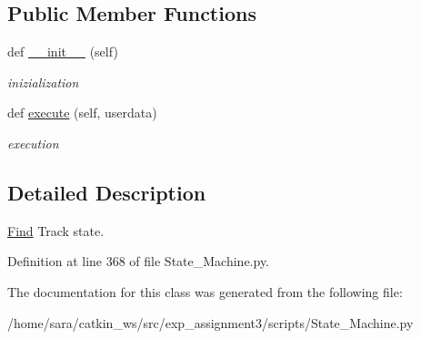 \subsection*{Public Member Functions}
\begin{DoxyCompactItemize}
\item 
\mbox{\label{classState__Machine_1_1Find__Track_abfa42aea92e882a9a1011290337e412e}} 
def \hyperlink{classState__Machine_1_1Find__Track_abfa42aea92e882a9a1011290337e412e}{\+\_\+\+\_\+init\+\_\+\+\_\+} (self)
\begin{DoxyCompactList}\small\item\em inizialization \end{DoxyCompactList}\item 
\mbox{\label{classState__Machine_1_1Find__Track_a3c72cc1a7b85cf64567464d119641e5e}} 
def \hyperlink{classState__Machine_1_1Find__Track_a3c72cc1a7b85cf64567464d119641e5e}{execute} (self, userdata)
\begin{DoxyCompactList}\small\item\em execution \end{DoxyCompactList}\end{DoxyCompactItemize}


\subsection{Detailed Description}
\hyperlink{classState__Machine_1_1Find}{Find} Track state. 

Definition at line 368 of file State\+\_\+\+Machine.\+py.



The documentation for this class was generated from the following file\+:\begin{DoxyCompactItemize}
\item 
/home/sara/catkin\+\_\+ws/src/exp\+\_\+assignment3/scripts/State\+\_\+\+Machine.\+py\end{DoxyCompactItemize}
